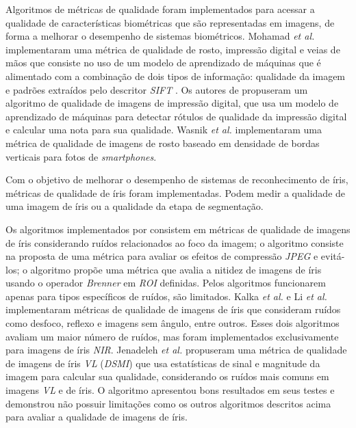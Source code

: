 \par Algoritmos de métricas de qualidade foram implementados para acessar a qualidade de características biométricas que são representadas em imagens, de forma a melhorar o desempenho de sistemas biométricos. Mohamad \textit{et al.} \cite{mohamad2015} implementaram uma métrica de qualidade de rosto, impressão digital e veias de mãos que consiste no uso de um modelo de aprendizado de máquinas que é alimentado com a combinação de dois tipos de informação: qualidade da imagem e padrões extraídos pelo descritor \textit{\acrshort{SIFT}} \cite{lowe2004}. Os autores de \cite{sharma2017} propuseram um algoritmo de qualidade de imagens de impressão digital, que usa um modelo de aprendizado de máquinas para detectar rótulos de qualidade da impressão digital e calcular uma nota para sua qualidade. Wasnik \textit{et al.} \cite{wasnik2017} implementaram uma métrica de qualidade de imagens de rosto baseado em densidade de bordas verticais para fotos de \textit{smartphones}.

\par Com o objetivo de melhorar o desempenho de sistemas de reconhecimento de íris, métricas de qualidade de íris foram implementadas. Podem medir a qualidade de uma imagem de íris ou a qualidade da etapa de segmentação.

\par Os algoritmos implementados por \cite{daugman2004, starovoitov2013-DSMI-45, wan2007-DSMI-50} consistem em métricas de qualidade de imagens de íris considerando ruídos relacionados ao foco da imagem; o algoritmo \cite{bergmller2017-DSMI-2} consiste na proposta de uma métrica para avaliar os efeitos de compressão \textit{JPEG} e evitá-los; o algoritmo \cite{chen2013-DSMI-4} propõe uma métrica que avalia a nitidez de imagens de íris usando o operador \textit{Brenner} em \textit{\acrfull{ROI}} definidas. Pelos algoritmos \cite{daugman2004, starovoitov2013-DSMI-45, wan2007-DSMI-50,bergmller2017-DSMI-2,chen2013-DSMI-4} funcionarem apenas para tipos específicos de ruídos, são limitados. Kalka \textit{et al.} \cite{kalka2010-DSMI-18} e Li \textit{et al.} \cite{li2011} implementaram métricas de qualidade de imagens de íris que consideram ruídos como desfoco, reflexo e imagens sem ângulo, entre outros. Esses dois algoritmos avaliam um maior número de ruídos, mas foram implementados exclusivamente para imagens de íris \textit{\acrshort{NIR}}. Jenadeleh \textit{et al.} \cite{Jenadeleh_2018_CVPR_Workshops} propuseram uma métrica de qualidade de imagens de íris \textit{\acrshort{VL}} (\textit{\acrshort{DSMI}}) que usa estatísticas de sinal e magnitude da imagem para calcular sua qualidade, considerando os ruídos mais comuns em imagens \textit{\acrshort{VL}} e de íris. O algoritmo apresentou bons resultados em seus testes e demonstrou não possuir limitações como os outros algoritmos descritos acima para avaliar a qualidade de imagens de íris.


